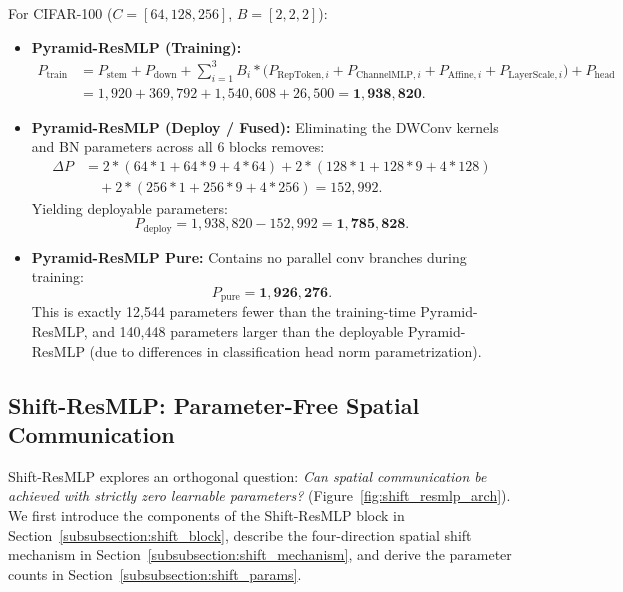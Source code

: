 For CIFAR-100 ($C=[64, 128, 256]$, $B=[2, 2, 2]$):
\begin{itemize}
    \item \textbf{Pyramid-ResMLP (Training):}
      \begin{align}
      P_{\text{train}} &= P_{\text{stem}} + P_{\text{down}} + \sum_{i=1}^{3} B_i * \big(P_{\text{RepToken}, i} + P_{\text{ChannelMLP}, i} + P_{\text{Affine}, i} + P_{\text{LayerScale}, i}\big) + P_{\text{head}} \nonumber \\
      &= 1,920 + 369,792 + 1,540,608 + 26,500 = \mathbf{1,938,820}.
      \end{align}
    \item \textbf{Pyramid-ResMLP (Deploy / Fused):}
      Eliminating the DWConv kernels and BN parameters across all 6 blocks removes:
      \begin{align}
      \Delta P &= 2 * (64*1 + 64*9 + 4*64) + 2 * (128*1 + 128*9 + 4*128) \nonumber \\
      &\quad + 2 * (256*1 + 256*9 + 4*256) = 152,992.
      \end{align}
      Yielding deployable parameters:
      \begin{equation}
      P_{\text{deploy}} = 1,938,820 - 152,992 = \mathbf{1,785,828}.
      \end{equation}
    \item \textbf{Pyramid-ResMLP Pure:}
      Contains no parallel conv branches during training:
      \begin{equation}
      P_{\text{pure}} = \mathbf{1,926,276}.
      \end{equation}
      This is exactly 12,544 parameters fewer than the training-time Pyramid-ResMLP, and 140,448 parameters larger than the deployable Pyramid-ResMLP (due to differences in classification head norm parametrization).
\end{itemize}

\subsection{Shift-ResMLP: Parameter-Free Spatial Communication}
\label{subsection:shift_resmlp}

Shift-ResMLP explores an orthogonal question: \textit{Can spatial communication be achieved with strictly zero learnable parameters?} (Figure~\ref{fig:shift_resmlp_arch}). We first introduce the components of the Shift-ResMLP block in Section~\ref{subsubsection:shift_block}, describe the four-direction spatial shift mechanism in Section~\ref{subsubsection:shift_mechanism}, and derive the parameter counts in Section~\ref{subsubsection:shift_params}.

